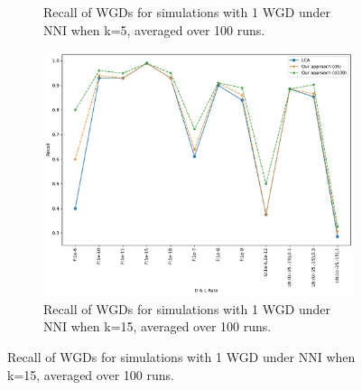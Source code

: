 \documentclass[10pt]{article}
\begin{document}
\begin{figure}[h!]
\begin{subfigure}[b]{0.31\textwidth}
        \caption{Recall of WGDs for simulations with 1 WGD under NNI when k=5, averaged over 100 runs.}
        \label{fig:recall-NNI-k5-wgd}
    \end{subfigure}
    \hfill
    \begin{subfigure}[b]{0.31\textwidth}
        \centering
        \includegraphics[width=\textwidth]{figs/recall-NNI-K15-WGD-t20-t80-Avg.pdf}
        \caption{Recall of WGDs for simulations with 1 WGD under NNI when k=15, averaged over 100 runs.}
        \label{fig:recall-NNI-k15-wgd}
    \end{subfigure}
    
    \vspace{1em} %


\end{figure}
\end{document}
